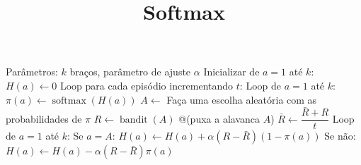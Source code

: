 \documentclass[brazilian,preview]{standalone}
\title{Softmax}
\begin{document}
\begin{algorithm}
Parâmetros: $k$ braços, parâmetro de ajuste $\alpha$ 
Inicializar de $a=1$ até $k$:
    $H(a) \leftarrow 0$ 
Loop para cada episódio incrementando $t$:
    Loop de $a=1$ até $k$:
        $\pi(a) \leftarrow \operatorname{softmax}(H(a))$ 
    $A \leftarrow$ Faça uma escolha aleatória com as probabilidades de $\pi$ 
    $R \leftarrow \operatorname{bandit}(A)$ @\hfill@ (puxa a alavanca $A$)
    $\bar{R} \leftarrow \dfrac{\bar{R} + R}{t}$
    Loop de $a=1$ até $k$:
      Se $a = A$:
        $H(a) \leftarrow H(a) + \alpha(R - \bar{R})(1 - \pi(a))$
      Se não:
        $H(a) \leftarrow H(a) - \alpha(R - \bar{R})\pi(a)$
\end{algorithm}
\end{document}
